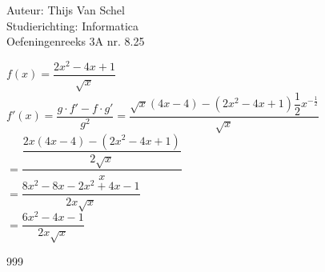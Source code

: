 \documentclass[a4paper]{article}
\begin{document}
  
\noindent \large Auteur: Thijs Van Schel \\
\noindent \large Studierichting: Informatica\\
\noindent \large Oefeningenreeks 3A nr. 8.25\\

\medskip

\normalsize

$f(x) = \dfrac{2x^2-4x+1}{\sqrt{x}}$\\

$f'(x) = \dfrac{g\cdot f' - f \cdot g'}{g^2} = \dfrac{\sqrt{x}(4x-4) - (2x^2-4x+1)\dfrac{1}{2}x^{-\tfrac{1}{2}}}{\sqrt{x}}$\\

$= \dfrac{\dfrac{2x(4x-4) - (2x^2-4x+1)}{2\sqrt{x}}}{x}$\\

$= \dfrac{8x^2-8x-2x^2+4x-1}{2x\sqrt{x}}$\\

$= \dfrac{6x^2-4x-1}{2x\sqrt{x}}$\\

\begin{thebibliography}{999}
\end{thebibliography}
\end{document}
